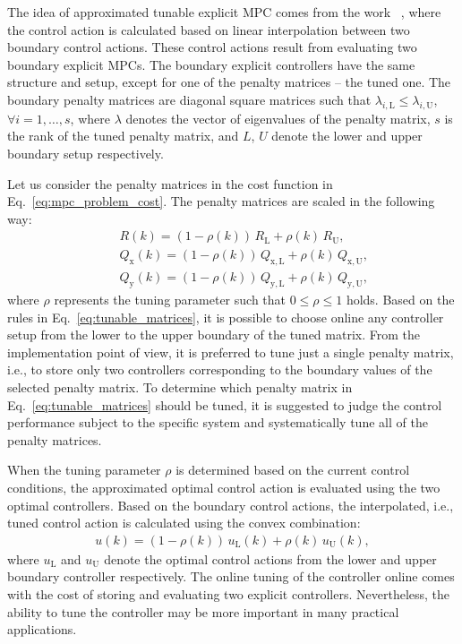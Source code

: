 \documentclass[preprint,12pt]{elsarticle}
\begin{document}
	The idea of approximated tunable explicit MPC comes from the work ~\cite{Klauco_tunable}, where the control action is calculated based on linear interpolation between two boundary control actions. These control actions result from evaluating two boundary explicit MPCs. The boundary explicit controllers have the same structure and setup, except for one of the penalty matrices -- the tuned one. The boundary penalty matrices are diagonal square matrices such that $\lambda_{i,\mathrm{L}} \le \lambda_{i,\mathrm{U}}$, $\forall i = 1,\dots,s$, where $\lambda$ denotes the vector of eigenvalues of the penalty matrix, $s$ is the rank of the tuned penalty matrix, and $L$, $U$ denote the lower and upper boundary setup respectively.
	
	Let us consider the penalty matrices in the cost function in Eq.~\eqref{eq:mpc_problem_cost}. The penalty matrices are scaled in the following way:
	\begin{subequations}
		\label{eq:tunable_matrices}
		\begin{eqnarray}
			\label{eq:tunable_R}
			&~& R(k) = (1-\rho(k)) \, R_\mathrm{L} + \rho(k) \, R_\mathrm{U}, \\
			\label{eq:tunable_Qx}
			&~& Q_\mathrm{x}(k) = (1-\rho(k)) \, Q_\mathrm{x,L} + \rho(k) \, Q_\mathrm{x,U}, \\
			\label{eq:tunable_Qy}
			&~& Q_\mathrm{y}(k) = (1-\rho(k)) \, Q_\mathrm{y,L} + \rho(k) \, Q_\mathrm{y,U},
		\end{eqnarray}
	\end{subequations}
	where $\rho$ represents the tuning parameter such that $0 \le \rho \le 1$ holds. Based on the rules in Eq.~\eqref{eq:tunable_matrices}, it is possible to choose online any controller setup from the lower to the upper boundary of the tuned matrix. From the implementation point of view, it is preferred to tune just a single penalty matrix, i.e., to store only two controllers corresponding to the boundary values of the selected penalty matrix. To determine which penalty matrix in Eq.~\eqref{eq:tunable_matrices} should be tuned, it is suggested to judge the control performance subject to the specific system and systematically tune all of the penalty matrices.
	
	When the tuning parameter $\rho$ is determined based on the current control conditions, the approximated optimal control action is evaluated using the two optimal controllers. Based on the boundary control actions, the interpolated, i.e., tuned control action is calculated using the convex combination:
		\begin{eqnarray}
			\label{eq:tunable_u}
			u(k) = (1-\rho(k)) \, u_\mathrm{L}(k) + \rho(k) \, u_\mathrm{U}(k),
		\end{eqnarray}
	where $u_\mathrm{L}$ and $u_\mathrm{U}$ denote the optimal control actions from the lower and upper boundary controller respectively. The online tuning of the controller online comes with the cost of storing and evaluating two explicit controllers. Nevertheless, the ability to tune the controller may be more important in many practical applications.
	
\end{document}
